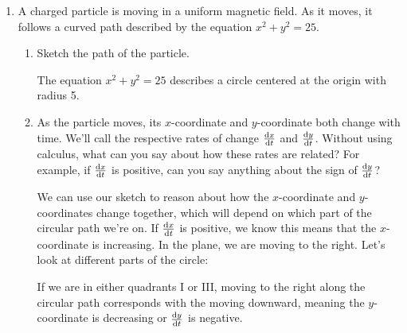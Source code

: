 \documentclass[main]{subfiles}
\begin{document}
\begin{enumerate}[resume]
\item A charged particle is moving in a uniform magnetic field. As it moves, it follows a curved path described by the equation $x^2+y^2=25$.
\begin{enumerate}
\item
\begin{problem}
Sketch the path of the particle.
\end{problem}
\pspace{\vfill}

\begin{solution}
    The equation $x^2+y^2=25$ describes a circle centered at the origin with radius 5. 

    \begin{center}
    \end{center}
\end{solution}
\item 
\begin{problem}
As the particle moves, its $x$-coordinate and $y$-coordinate both change with time. We'll call the respective rates of change $\diff{x}{t}$ and $\diff{y}{t}$. Without using calculus, what can you say about how these rates are related? For example, if $\diff{x}{t}$ is positive, can you say anything about the sign of $\diff{y}{t}$?
\end{problem}
\pspace{\vfill}

\begin{solution}
    We can use our sketch to reason about how the $x$-coordinate and $y$-coordinates change together, which will depend on which part of the circular path we're on. If  $\diff{x}{t}$ is positive, we know this means that the $x$-coordinate is increasing. In the plane, we are moving to the right. Let's look at different parts of the circle: 
    
    If we are in either quadrants I or III, moving to the right along the circular path corresponds with the moving downward, meaning the $y$-coordinate is decreasing or $\diff{y}{t}$ is negative. 
    

\end{solution}
\end{enumerate}
\end{enumerate}
\end{document}
